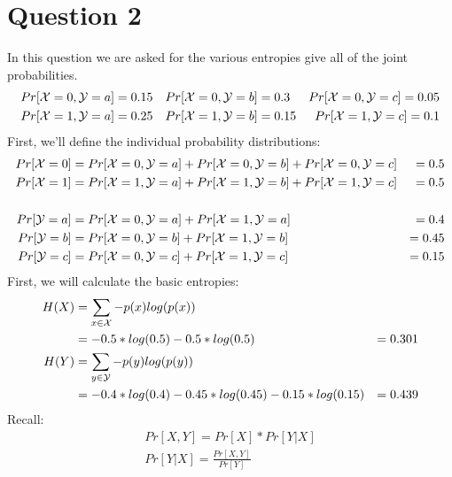 \documentclass{article}
\begin{document}
\section{Question 2}
In this question we are asked for the various entropies give all of the joint probabilities.
\begin{align*}
Pr[ \mathcal{X} = 0,  \mathcal{Y} = a] = 0.15 &~~~
Pr[ \mathcal{X} = 0,  \mathcal{Y} = b] = 0.3 &
Pr[ \mathcal{X} = 0,  \mathcal{Y} = c] = 0.05\\
Pr[ \mathcal{X} = 1,  \mathcal{Y} = a] = 0.25 &~~~
Pr[ \mathcal{X} = 1,  \mathcal{Y} = b] = 0.15 &
Pr[ \mathcal{X} = 1,  \mathcal{Y} = c] = 0.1\\
\end{align*}
First, we'll define the individual probability distributions:
\begin{align*}
Pr[ \mathcal{X} = 0] &= Pr[ \mathcal{X} = 0,  \mathcal{Y} = a] + Pr[ \mathcal{X} = 0,  \mathcal{Y} = b]  + Pr[ \mathcal{X} = 0,  \mathcal{Y} = c]  &= 0.5\\
Pr[ \mathcal{X} = 1] &= Pr[ \mathcal{X} = 1,  \mathcal{Y} = a] + Pr[ \mathcal{X} = 1,  \mathcal{Y} = b]  + Pr[ \mathcal{X} = 1,  \mathcal{Y} = c]  &= 0.5\\
\\
Pr[ \mathcal{Y} = a] &= Pr[ \mathcal{X} = 0,  \mathcal{Y} = a]  + Pr[ \mathcal{X} = 1,  \mathcal{Y} = a] &= 0.4\\
Pr[ \mathcal{Y} = b] &= Pr[ \mathcal{X} = 0,  \mathcal{Y} = b]  + Pr[ \mathcal{X} = 1,  \mathcal{Y} = b] &= 0.45\\
Pr[ \mathcal{Y} = c] &= Pr[ \mathcal{X} = 0,  \mathcal{Y} = c]  + Pr[ \mathcal{X} = 1,  \mathcal{Y} = c] &= 0.15
\end{align*}
First, we will calculate the basic entropies:
\begin{align*}
H(X) &= \sum_{x \in  \mathcal{X}} -p(x)log(p(x))\\
 &= -0.5*log(0.5)-0.5*log(0.5) &= 0.301\\
H(Y) &= \sum_{y \in  \mathcal{Y}} -p(y)log(p(y))\\
 &= -0.4*log(0.4)-0.45*log(0.45)-0.15*log(0.15) &= 0.439
\end{align*}
Recall:
\begin{align*}
Pr[X,Y] = Pr[X]*Pr[Y|X]\\
Pr[Y|X] = \frac{Pr[X,Y]}{Pr[Y]}
\end{align*}
\end{document}
